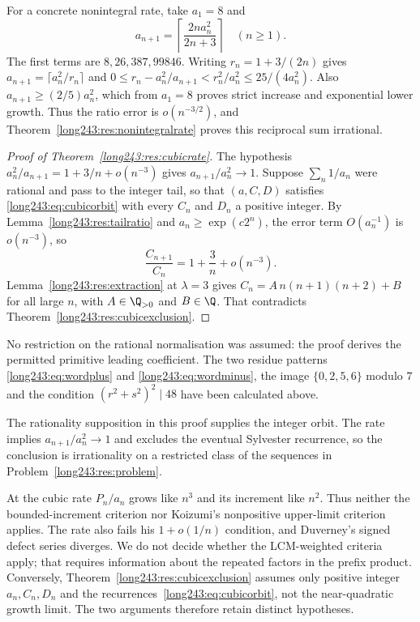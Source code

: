 For a concrete nonintegral rate, take $a_1=8$ and
\[
 a_{n+1}=\left\lceil\frac{2n a_n^2}{2n+3}\right\rceil
 \quad(n\ge1).
\]
The first terms are $8,26,387,99846$. Writing
$r_n=1+3/(2n)$ gives $a_{n+1}=\lceil a_n^2/r_n\rceil$ and
$0\le r_n-a_n^2/a_{n+1}<r_n^2/a_n^2\le25/(4a_n^2)$.
Also $a_{n+1}\ge(2/5)a_n^2$, which from $a_1=8$ proves strict
increase and exponential lower growth. Thus the ratio error is
$o(n^{-3/2})$, and Theorem~\ref{long243:res:nonintegralrate}
proves this reciprocal sum irrational.

\begin{proof}[Proof of Theorem~\ref{long243:res:cubicrate}]
The hypothesis $a_n^2/a_{n+1}=1+3/n+o(n^{-3})$ gives $a_{n+1}/a_n^2\to1$.
Suppose $\sum_n1/a_n$ were rational and pass to the integer tail, so
that $(a,C,D)$ satisfies \eqref{long243:eq:cubicorbit} with every $C_n$ and $D_n$ a
positive integer.  By Lemma~\ref{long243:res:tailratio} and $a_n\ge\exp(c2^n)$, the
error term $O(a_n^{-1})$ is $o(n^{-3})$, so
\[
 \frac{C_{n+1}}{C_n}=1+\frac3n+o(n^{-3}).
\]
Lemma~\ref{long243:res:extraction} at $\lambda=3$ gives
$C_n=A\,n(n+1)(n+2)+B$ for all large $n$, with $A\in\Q_{>0}$ and $B\in\Q$.
That contradicts Theorem~\ref{long243:res:cubicexclusion}.
\end{proof}

No restriction on the rational normalisation was assumed: the proof
derives the permitted primitive leading coefficient. The two residue
patterns \eqref{long243:eq:wordplus} and \eqref{long243:eq:wordminus},
the image $\{0,2,5,6\}$ modulo $7$ and the condition
$(r^2+s^2)^2\mid48$ have been calculated above.

The rationality supposition in this proof supplies the integer orbit.
The rate implies $a_{n+1}/a_n^2\to1$ and excludes the eventual
Sylvester recurrence,
so the conclusion is irrationality on a restricted class of the sequences
in Problem~\ref{long243:res:problem}.

At the cubic rate $P_n/a_n$ grows like $n^3$ and its increment like
$n^2$.
Thus neither the bounded-increment criterion nor Koizumi's nonpositive
upper-limit criterion applies. The rate also fails his $1+o(1/n)$
condition, and Duverney's signed defect series diverges. We do not decide
whether the LCM-weighted criteria apply; that requires information about
the repeated factors in the prefix product. Conversely,
Theorem~\ref{long243:res:cubicexclusion} assumes only positive integer
$a_n,C_n,D_n$ and the recurrences~\eqref{long243:eq:cubicorbit}, not the
near-quadratic growth limit. The two arguments therefore retain distinct
hypotheses.

